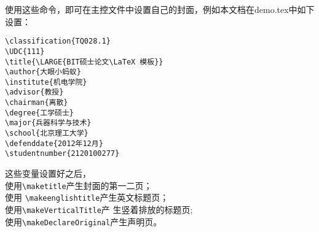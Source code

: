 使用这些命令，即可在主控文件中设置自己的封面，例如本文档在demo.tex中如下
设置：
\begin{lstlisting}
\classification{TQ028.1}
\UDC{111}
\title{\LARGE{BIT硕士论文\LaTeX 模板}}
\author{大眼小蚂蚁}
\institute{机电学院}
\advisor{教授}
\chairman{离散}
\degree{工学硕士}
\major{兵器科学与技术}
\school{北京理工大学}
\defenddate{2012年12月}
\studentnumber{2120100277}
\end{lstlisting}

这些变量设置好之后，\\使用\verb+\maketitle+产生封面的第一二页；\\使用
\verb+\makeenglishtitle+产生英文标题页；\\使用\verb+\makeVerticalTitle+产
生竖着排放的标题页;\\使用\verb+\makeDeclareOriginal+产生声明页。

